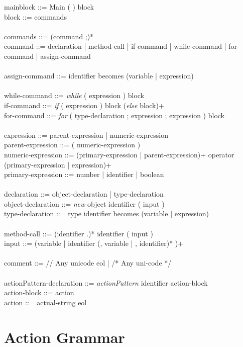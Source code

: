 {mainblock ::= Main ( ) block \\
block ::= { commands } \\
\\
commands ::= (command ;)* \\
command ::= declaration | method-call | if-command | while-command | for-command | assign-command \\
\\
assign-command ::= identifier becomes  (variable | expression) \\
\\
while-command ::= \textit{while} ( expression ) block \\
if-command ::= \textit{if} ( expression ) block (\textit{else} block)+ \\
for-command ::= \textit{for} ( type-declaration ; expression ; expression ) block \\
\\
expression ::= parent-expression | numeric-expression \\
parent-expression ::= ( numeric-expression ) \\
numeric-expression ::= (primary-expression | parent-expression)+ operator (primary-expression | expression)+ \\
primary-expression ::= number | identifier | boolean \\
\\
declaration ::= object-declaration | type-declaration \\
object-declaration ::= \textit{new} object identifier ( input ) \\
type-declaration ::= type identifier becomes (variable | expression) \\
\\
method-call ::= (identifier .)* identifier ( input ) \\
input ::= (variable | identifier (, variable | , identifier)* )+ \\
\\
comment ::= // Any unicode eol | /* Any uni-code */ \\
\\
actionPattern-declaration ::= \textit{actionPattern} identifier action-block \\
action-block ::= { action } \\
action ::= actual-string eol


\section{Action Grammar}
\label{actiongrammar}

}
